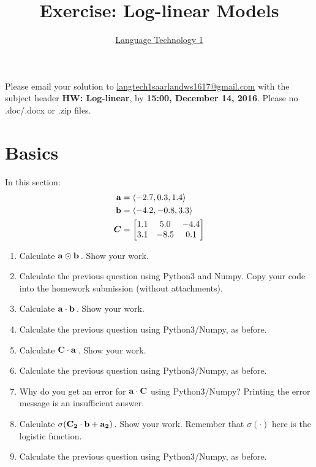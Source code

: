 \documentclass[paper=a4, fontsize=11pt]{article}
\title{Exercise: Log-linear Models}
\author{\href{https://github.com/jonsafari/lt1}{Language Technology 1}}
\date{}
\begin{document}
\maketitle
\begin{spacing}{1.8}

Please email your solution to \url{langtech1saarlandws1617@gmail.com} with the subject header \textbf{HW: Log-linear}, by \textbf{15:00, December 14, 2016}.  Please no .doc/.docx or .zip files.


\section{Basics}
In this section:
\begin{align}
{\bf a} &= \langle -2.7, 0.3, 1.4 \rangle \\
{\bf b} &= \langle -4.2, -0.8, 3.3 \rangle \\
{\boldsymbol C} &= \begin{bmatrix} 1.1 & 5.0 & -4.4 \\ 3.1 & -8.5 & 0.1 \end{bmatrix}
\end{align}

\begin{enumerate}
	\item Calculate $\bf a \odot b$\,.  Show your work.
	\item Calculate the previous question using Python3 and Numpy.  Copy your code into the homework submission (without attachments).
	\item Calculate $\bf a \cdot b$\,.  Show your work.
	\item Calculate the previous question using Python3/Numpy, as before.
	\item Calculate $\bf C \cdot a$\,.  Show your work.
	\item Calculate the previous question using Python3/Numpy, as before.
	\item Why do you get an error for $\bf a \cdot C$ using Python3/Numpy?  Printing the error message is an insufficient answer.
	\item Calculate $\sigma(\bf C_2 \cdot b + a_2)$\,. Show your work. Remember that $\sigma(\cdot)$ here is the logistic function.
	\item Calculate the previous question using Python3/Numpy, as before.
\end{enumerate}


\end{spacing}
\end{document}
